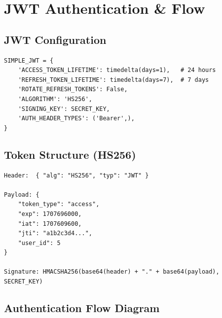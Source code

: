 \documentclass[11pt,a4paper]{article}
\begin{document}
\newpage
\section{JWT Authentication \& Flow}

\subsection{JWT Configuration}

\begin{lstlisting}[style=jsonStyle, title={\texttt{settings.py} -- SIMPLE\_JWT}]
SIMPLE_JWT = {
    'ACCESS_TOKEN_LIFETIME': timedelta(days=1),   # 24 hours
    'REFRESH_TOKEN_LIFETIME': timedelta(days=7),  # 7 days
    'ROTATE_REFRESH_TOKENS': False,
    'ALGORITHM': 'HS256',
    'SIGNING_KEY': SECRET_KEY,
    'AUTH_HEADER_TYPES': ('Bearer',),
}
\end{lstlisting}

\subsection{Token Structure (HS256)}

\begin{lstlisting}[style=jsonStyle, title={JWT Payload (decoded)}]
Header:  { "alg": "HS256", "typ": "JWT" }

Payload: {
    "token_type": "access",
    "exp": 1707696000,
    "iat": 1707609600,
    "jti": "a1b2c3d4...",
    "user_id": 5
}

Signature: HMACSHA256(base64(header) + "." + base64(payload), SECRET_KEY)
\end{lstlisting}

\subsection{Authentication Flow Diagram}
\end{document}
